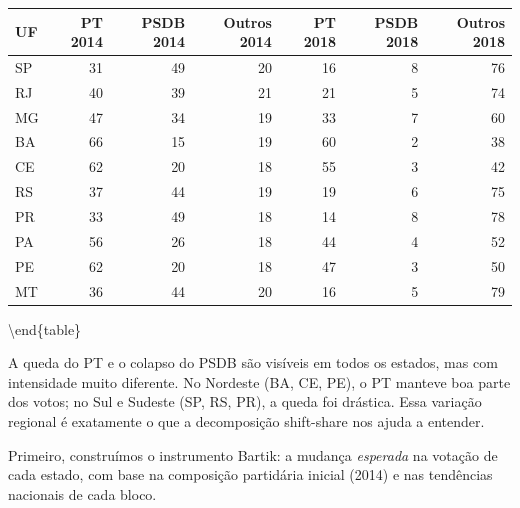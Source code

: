 \documentclass[
]{article}
\begin{document}
\begin{tabular}[t]{l|r|r|r|r|r|r}
\hline
UF & PT 2014 & PSDB 2014 & Outros 2014 & PT 2018 & PSDB 2018 & Outros 2018\\
\hline
SP & 31 & 49 & 20 & 16 & 8 & 76\\
\hline
RJ & 40 & 39 & 21 & 21 & 5 & 74\\
\hline
MG & 47 & 34 & 19 & 33 & 7 & 60\\
\hline
BA & 66 & 15 & 19 & 60 & 2 & 38\\
\hline
CE & 62 & 20 & 18 & 55 & 3 & 42\\
\hline
RS & 37 & 44 & 19 & 19 & 6 & 75\\
\hline
PR & 33 & 49 & 18 & 14 & 8 & 78\\
\hline
PA & 56 & 26 & 18 & 44 & 4 & 52\\
\hline
PE & 62 & 20 & 18 & 47 & 3 & 50\\
\hline
MT & 36 & 44 & 20 & 16 & 5 & 79\\
\hline
\end{tabular}

\textbackslash end\{table\}

A queda do PT e o colapso do PSDB são visíveis em todos os estados, mas com intensidade muito diferente. No Nordeste (BA, CE, PE), o PT manteve boa parte dos votos; no Sul e Sudeste (SP, RS, PR), a queda foi drástica. Essa variação regional é exatamente o que a decomposição shift-share nos ajuda a entender.

Primeiro, construímos o instrumento Bartik: a mudança \emph{esperada} na votação de cada estado, com base na composição partidária inicial (2014) e nas tendências nacionais de cada bloco.
\end{document}
